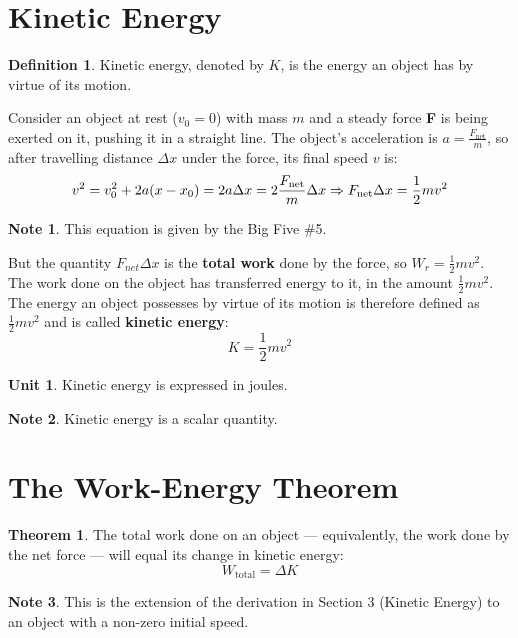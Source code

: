 \documentclass{article}
\theoremstyle{definition}
\newtheorem*{unit}{Unit}
\theoremstyle{definition}
\newtheorem*{note}{Note}
\theoremstyle{definition}
\newtheorem*{theorem}{Theorem}
\theoremstyle{definition}
\newtheorem*{definition}{Definition}
\theoremstyle{definition}
\begin{document}
\section{Kinetic Energy}
\begin{definition}
    Kinetic energy, denoted by $K$, is the energy an object has by virtue of its motion.
\end{definition}
Consider an object at rest ($v_{0} = 0$) with mass $m$ and a steady force \textbf{F} is being exerted on it, pushing it in a straight line. The object's acceleration is $a = \frac{F_{\text{net}}}{m}$, so after travelling distance $\Delta x$ under the force, its final speed $v$ is:
\begin{equation*}
    v^{2} = v_{0}^2 + 2a(x-x_{0})=2a \Delta x = 2 \frac{F_{\text{net}}}{m} \Delta x \space \Rightarrow \space F_{\text{net}} \Delta x = \frac{1}{2}mv^{2}
\end{equation*}
\begin{note}
    This equation is given by the Big Five \#5.
\end{note}
But the quantity $F_{net} \Delta x$ is the \textbf{total work} done by the force, so $W_{r} = \frac{1}{2}mv^{2}$. The work done on the object has transferred energy to it, in the amount $\frac{1}{2}mv^{2}$. \\
The energy an object possesses by  virtue of its motion is therefore defined as $\frac{1}{2}mv^{2}$ and is called \textbf{kinetic energy}:
\begin{equation*}
    K = \frac{1}{2}mv^{2}
\end{equation*}
\begin{unit}
    Kinetic energy is expressed in joules.
\end{unit}
\begin{note}
    Kinetic energy is a scalar quantity.
\end{note}

\newpage
\section{The Work-Energy Theorem}
\begin{theorem}
    The total work done on an object --- equivalently, the work done by the net force --- will equal its change in kinetic energy:
    \begin{equation*}
        W_{\text{total}} = \Delta K
    \end{equation*}
    \begin{note}
        This is the extension of the derivation in Section 3 (Kinetic Energy) to an object with a non-zero initial speed.
    \end{note}
\end{theorem}
\end{document}
